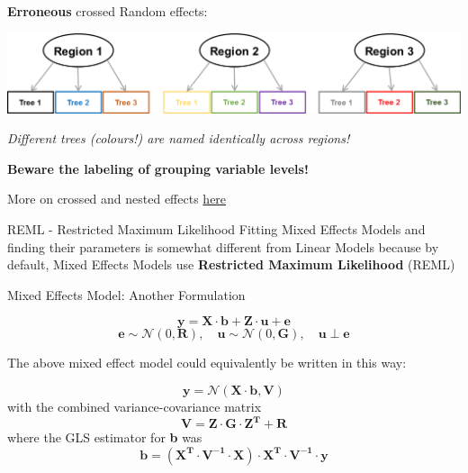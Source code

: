 \documentclass{beamer}
\begin{document}
\begin{frame}
    \Large
    \textbf{Erroneous} crossed Random effects:
    \vspace{0.2cm}
    
    \begin{center}
        \includegraphics[width=\textwidth]{lectures/day_5_theory_of_mems/figures/ambigous_2.png}
    \end{center}
    \vspace{0.2cm}

    \textit{Different trees (colours!) are named identically across regions!}
    \vspace{0.2cm}
    
    \textbf{Beware the labeling of grouping variable levels!}
\end{frame}

\begin{frame}
    \Large
    More on crossed and nested effects \color{blue}\href{https://stats.stackexchange.com/questions/228800/crossed-vs-nested-random-effects-how-do-they-differ-and-how-are-they-specified}{here}
\end{frame}

\begin{frame}{REML - Restricted Maximum Likelihood}
    \Large
    Fitting Mixed Effects Models and finding their parameters is somewhat different from Linear Models because by default, Mixed Effects Models use \textbf{Restricted Maximum Likelihood} (REML)
\end{frame}


\begin{frame}{Mixed Effects Model: Another Formulation}

\large
    \[
    \mathbf{y} = \mathbf{X} \cdot \mathbf{b} + \mathbf{Z} \cdot \mathbf{u} + \mathbf{e}
    \]
    \[
    \mathbf{e} \sim \mathcal{N}(0, \mathbf{R}), \quad \mathbf{u} \sim \mathcal{N}(0, \mathbf{G}), \quad \mathbf{u} \; \bot \; \mathbf{e}
    \]
    
\large
    The above mixed effect model could equivalently be written in this way:
    \vspace{0.2cm}
    
    \[
    \mathbf{y} = \mathcal{N} (\mathbf{X} \cdot \mathbf{b}, \mathbf{V})
    \]
    with the combined variance-covariance matrix
    \[
    \mathbf{V} = \mathbf{Z} \cdot \mathbf{G} \cdot \mathbf{Z^T} + \mathbf{R}
    \]
    where the GLS estimator for \textbf{b} was
    \[
    \mathbf{b} = ( \mathbf{X^T} \cdot \mathbf{V^{-1}} \cdot \mathbf{X}) \cdot \mathbf{X^T} \cdot \mathbf{V^{-1}} \cdot \mathbf{y}
    \]
\end{frame}
\end{document}

